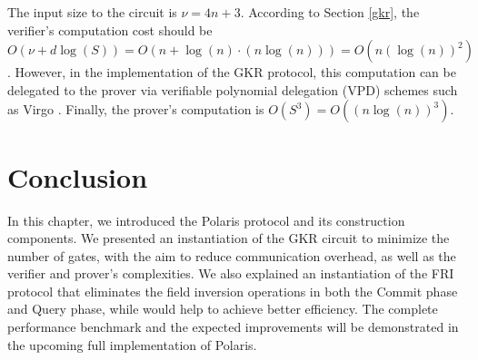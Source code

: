 The input size to the circuit is $\nu = 4n + 3$. According to Section \ref{gkr}, the verifier's computation cost should be $O(\nu + d\log(S)) = O(n + \log(n) \cdot (n\log(n))) = O(n (\log(n))^2)$. However, in the implementation of the GKR protocol, this computation can be delegated to the prover via verifiable polynomial delegation (VPD) schemes such as Virgo \cite{Zhang2019VirgoZK}. Finally, the prover's computation is $O(S^3)=O((n\log(n))^3)$.

\section{Conclusion}
In this chapter, we introduced the Polaris protocol and its construction components. We presented an instantiation of the GKR circuit to minimize the number of gates, with the aim to reduce communication overhead, as well as the verifier and prover's complexities. We also explained an instantiation of the FRI protocol that eliminates the field inversion operations in both the Commit phase and Query phase, while would help to achieve better efficiency.  The complete performance benchmark and the expected improvements will be demonstrated in the upcoming full implementation of Polaris.
